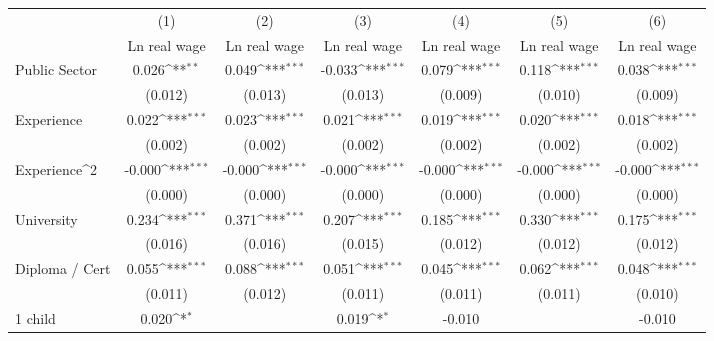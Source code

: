 {
\def\sym#1{\ifmmode^{#1}\else\(^{#1}\)\fi}
\begin{tabular}{l*{6}{c}}
\hline\hline
                    &\multicolumn{1}{c}{(1)}&\multicolumn{1}{c}{(2)}&\multicolumn{1}{c}{(3)}&\multicolumn{1}{c}{(4)}&\multicolumn{1}{c}{(5)}&\multicolumn{1}{c}{(6)}\\
                    &\multicolumn{1}{c}{Ln real wage}&\multicolumn{1}{c}{Ln real wage}&\multicolumn{1}{c}{Ln real wage}&\multicolumn{1}{c}{Ln real wage}&\multicolumn{1}{c}{Ln real wage}&\multicolumn{1}{c}{Ln real wage}\\
\hline
Public Sector       &       0.026\sym{**} &       0.049\sym{***}&      -0.033\sym{***}&       0.079\sym{***}&       0.118\sym{***}&       0.038\sym{***}\\
                    &     (0.012)         &     (0.013)         &     (0.013)         &     (0.009)         &     (0.010)         &     (0.009)         \\
Experience          &       0.022\sym{***}&       0.023\sym{***}&       0.021\sym{***}&       0.019\sym{***}&       0.020\sym{***}&       0.018\sym{***}\\
                    &     (0.002)         &     (0.002)         &     (0.002)         &     (0.002)         &     (0.002)         &     (0.002)         \\
Experience^{2}      &      -0.000\sym{***}&      -0.000\sym{***}&      -0.000\sym{***}&      -0.000\sym{***}&      -0.000\sym{***}&      -0.000\sym{***}\\
                    &     (0.000)         &     (0.000)         &     (0.000)         &     (0.000)         &     (0.000)         &     (0.000)         \\
University          &       0.234\sym{***}&       0.371\sym{***}&       0.207\sym{***}&       0.185\sym{***}&       0.330\sym{***}&       0.175\sym{***}\\
                    &     (0.016)         &     (0.016)         &     (0.015)         &     (0.012)         &     (0.012)         &     (0.012)         \\
Diploma / Cert      &       0.055\sym{***}&       0.088\sym{***}&       0.051\sym{***}&       0.045\sym{***}&       0.062\sym{***}&       0.048\sym{***}\\
                    &     (0.011)         &     (0.012)         &     (0.011)         &     (0.011)         &     (0.011)         &     (0.010)         \\
1 child             &       0.020\sym{*}  &                     &       0.019\sym{*}  &      -0.010         &                     &      -0.010         \\

\end{tabular}}
